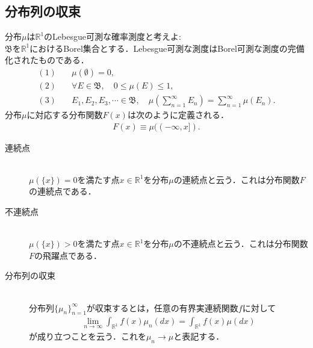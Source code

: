 \documentclass[a4j,papersize,disablejfam,slide,14pt]{jsarticle}
\begin{document}
\subsection{分布列の収束}
	分布$\mu$は$\mathbb{R}^1$の{\rm Lebesgue}可測な確率測度と考えよ:\\
    $\mathfrak{B}$を$\mathbb{R}^1$における{\rm Borel}集合とする．{\rm Lebesgue}可測な測度は{\rm Borel}可測な測度の完備化されたものである．
    \begin{align}
    	(1) &\quad \mu(\emptyset) = 0,\\
        (2) &\quad \forall E \in \mathfrak{B}, \quad 0 \leq \mu(E) \leq 1,\\
        (3) &\quad E_1,E_2,E_3,\cdots \in \mathfrak{B},\quad \mu\left(\sum_{n=1}^{\infty} E_n\right) = \sum_{n=1}^{\infty} \mu(E_n).
    \end{align}
    分布$\mu$に対応する分布関数$F(x)$は次のように定義される．
    \begin{align}
    	F(x) \equiv \mu((-\infty, x]).
    \end{align}
    \begin{screen}
    	\begin{description}
        	\item[連続点]\mbox{}\\
        		$\mu(\{x\}) = 0$を満たす点$x \in \mathbb{R}^1$を分布$\mu$の連続点と云う．これは分布関数$F$の連続点である．
            \item[不連続点]\mbox{}\\
            	$\mu(\{x\}) > 0$を満たす点$x \in \mathbb{R}^1$を分布$\mu$の不連続点と云う．これは分布関数$F$の飛躍点である．
        \end{description}
    \end{screen}
    \begin{screen}
    	\begin{description}
        	\item[分布列の収束]\mbox{}\\
    			分布列$\{ \mu_n \}_{n=1}^{\infty}$が収束するとは，任意の有界実連続関数$f$に対して
    			\begin{align}
    				\lim_{n \to \infty} \int_{\mathbb{R}^1} f(x) \mu_n(dx) = \int_{\mathbb{R}^1} f(x) \mu(dx)
    			\end{align}
    			が成り立つことを云う．これを$\mu_n \to \mu$と表記する．
        \end{description}
    \end{screen}
    
\end{document}
